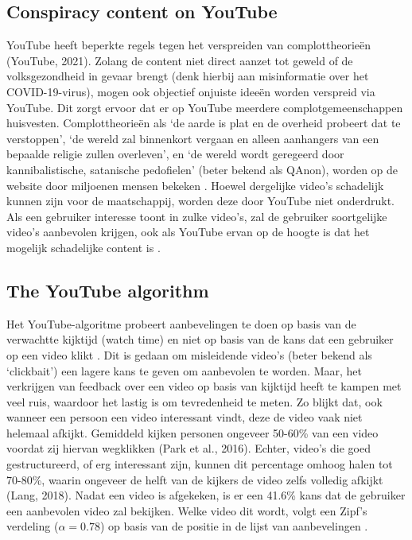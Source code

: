 \documentclass[../main.tex]{subfiles}
\begin{document}
\subsection{Conspiracy content on YouTube}
YouTube heeft beperkte regels tegen het verspreiden van complottheorieën (YouTube, 2021). Zolang de content niet direct aanzet tot geweld of de volksgezondheid in gevaar brengt (denk hierbij aan misinformatie over het COVID-19-virus), mogen ook objectief onjuiste ideeën worden verspreid via YouTube. Dit zorgt ervoor dat er op YouTube meerdere complotgemeenschappen huisvesten. Complottheorieën als ‘de aarde is plat en de overheid probeert dat te verstoppen’, ‘de wereld zal binnenkort vergaan en alleen aanhangers van een bepaalde religie zullen overleven’, en ‘de wereld wordt geregeerd door kannibalistische, satanische pedofielen’ (beter bekend als QAnon), worden op de website door miljoenen mensen bekeken \citep{paolillo2018flat, miller2021characterizing}. Hoewel dergelijke video’s schadelijk kunnen zijn voor de maatschappij, worden deze door YouTube niet onderdrukt. Als een gebruiker interesse toont in zulke video’s, zal de gebruiker soortgelijke video’s aanbevolen krijgen, ook als YouTube ervan op de hoogte is dat het mogelijk schadelijke content is \citep{ledwich2019algorithmic}.

\subsection{The YouTube algorithm}
Het YouTube-algoritme probeert aanbevelingen te doen op basis van de verwachtte kijktijd (watch time) en niet op basis van de kans dat een gebruiker op een video klikt \citep{covington2016deep}. Dit is gedaan om misleidende video’s (beter bekend als ‘clickbait’) een lagere kans te geven om aanbevolen te worden. Maar, het verkrijgen van feedback over een video op basis van kijktijd heeft te kampen met veel ruis, waardoor het lastig is om tevredenheid te meten. Zo blijkt dat, ook wanneer een persoon een video interessant vindt, deze de video vaak niet helemaal afkijkt. Gemiddeld kijken personen ongeveer 50-60\% van een video voordat zij hiervan wegklikken (Park et al., 2016). Echter, video’s die goed gestructureerd, of erg interessant zijn, kunnen dit percentage omhoog halen tot 70-80\%, waarin ongeveer de helft van de kijkers de video zelfs volledig afkijkt (Lang, 2018). Nadat een video is afgekeken, is er een 41.6\% kans dat de gebruiker een aanbevolen video zal bekijken. Welke video dit wordt, volgt een Zipf’s verdeling ($\alpha = 0.78$) op basis van de positie in de lijst van aanbevelingen \citep{zhou2010impact}. 
\end{document}
